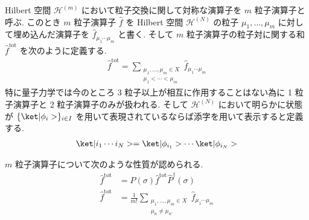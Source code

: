 \documentclass[uplatex,dvipdfmx,a4paper,11pt]{jlreq}
\newcommand{\HH}{\mathcal{H}}
\numberwithin{equation}{section}
\theoremstyle{definition}
\begin{document}
\begin{definition}[$m$ 粒子演算子]
  Hilbert 空間 $\HH^{(m)}$ において粒子交換に関して対称な演算子を $m$ 粒子演算子と呼ぶ.
  このとき $m$ 粒子演算子 $\hat{f}$ を Hilbert 空間 $\HH^{(N)}$ の粒子 $\mu_1,\ldots,\mu_m$ に対して埋め込んだ演算子を $\hat{f}_{\mu_1\cdots\mu_m}$ と書く.
  そして $m$ 粒子演算子の粒子対に関する和 $\hat{f}^{\mathrm{tot}}$ を次のように定義する.
  \begin{align}
    \hat{f}^{\mathrm{tot}} = \sum_{\substack{\mu_1,\ldots,\mu_m\in X \\ \mu_1 < \cdots < \mu_m}}\hat{f}_{\mu_1\cdots\mu_m}
  \end{align}
  特に量子力学では今のところ 3 粒子以上が相互に作用することはない為に 1 粒子演算子と 2 粒子演算子のみが扱われる.
  そして $\HH^{(N)}$ において明らかに状態が $\{\ket|\phi_i>\}_{i\in I}$ を用いて表現されているならば添字を用いて表示すると定義する.
  \begin{align}
    \ket|i_1\cdots i_N> = \ket|\phi_{i_1}>\cdots\ket|\phi_{i_N}>
  \end{align}
\end{definition}
\begin{theorem}
  $m$ 粒子演算子について次のような性質が認められる.
  \begin{align}
    \hat{f}^{\mathrm{tot}} & = \hat{P}(\sigma)\hat{f}^{\mathrm{tot}}\hat{P}^\dagger(\sigma) \\
    \hat{f}^{\mathrm{tot}} & = \frac{1}{m!}\sum_{\substack{\mu_1,\ldots,\mu_m\in X          \\ \mu_n \neq \mu_{n'}}}\hat{f}_{\mu_1\cdots\mu_m}
  \end{align}
\end{theorem}
\end{document}
